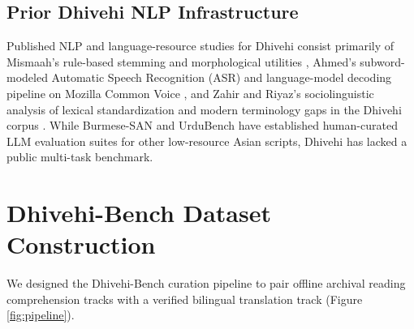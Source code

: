 \documentclass[acmsmall,review,anonymous]{acmart}
\begin{document}
\subsection{Prior Dhivehi NLP Infrastructure}
Published NLP and language-resource studies for Dhivehi consist primarily of Mismaah's rule-based stemming and morphological utilities \cite{mismaah_dhivehi_nlp_2023}, Ahmed's subword-modeled Automatic Speech Recognition (ASR) and language-model decoding pipeline on Mozilla Common Voice \cite{ardila_common_2020, ahmed_improving_2023}, and Zahir and Riyaz's sociolinguistic analysis of lexical standardization and modern terminology gaps in the Dhivehi corpus \cite{zahir_expanding_2024}. While Burmese-SAN \cite{aung_burmese-san_2026} and UrduBench \cite{shafique_urdubench_2026} have established human-curated LLM evaluation suites for other low-resource Asian scripts, Dhivehi has lacked a public multi-task benchmark.

\section{Dhivehi-Bench Dataset Construction}
\label{sec:dataset}

We designed the Dhivehi-Bench curation pipeline to pair offline archival reading comprehension tracks with a verified bilingual translation track (Figure \ref{fig:pipeline}).
\end{document}
